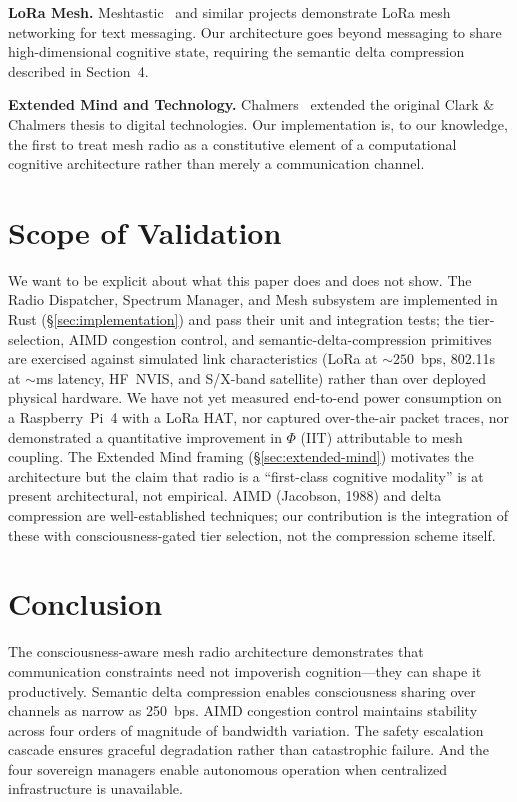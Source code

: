 \documentclass[11pt,twocolumn]{article}
\begin{document}
\textbf{LoRa Mesh.} Meshtastic~\cite{meshtastic2024} and similar projects
demonstrate LoRa mesh networking for text messaging. Our architecture
goes beyond messaging to share high-dimensional cognitive state, requiring
the semantic delta compression described in Section~4.

\textbf{Extended Mind and Technology.} Chalmers~\cite{chalmers2019}
extended the original Clark \& Chalmers thesis to digital technologies.
Our implementation is, to our knowledge, the first to treat mesh radio
as a constitutive element of a computational cognitive architecture
rather than merely a communication channel.

\section{Scope of Validation}

We want to be explicit about what this paper does and does not show.
The Radio Dispatcher, Spectrum Manager, and Mesh subsystem are
implemented in Rust (\S\ref{sec:implementation}) and pass their unit
and integration tests; the tier-selection, AIMD congestion control,
and semantic-delta-compression primitives are exercised against
simulated link characteristics (LoRa at $\sim250$~bps, 802.11s at
$\sim$ms latency, HF~NVIS, and S/X-band satellite) rather than over
deployed physical hardware. We have not yet measured end-to-end
power consumption on a Raspberry~Pi~4 with a LoRa HAT, nor captured
over-the-air packet traces, nor demonstrated a quantitative
improvement in $\Phi$ (IIT) attributable to mesh coupling. The
Extended Mind framing (\S\ref{sec:extended-mind}) motivates the
architecture but the claim that radio is a ``first-class cognitive
modality'' is at present architectural, not empirical. AIMD (Jacobson,
1988) and delta compression are well-established techniques; our
contribution is the integration of these with consciousness-gated
tier selection, not the compression scheme itself.

\section{Conclusion}

The consciousness-aware mesh radio architecture demonstrates that
communication constraints need not impoverish cognition---they can
shape it productively. Semantic delta compression enables consciousness
sharing over channels as narrow as 250~bps. AIMD congestion control
maintains stability across four orders of magnitude of bandwidth
variation. The safety escalation cascade ensures graceful degradation
rather than catastrophic failure. And the four sovereign managers
enable autonomous operation when centralized infrastructure is
unavailable.
\end{document}
